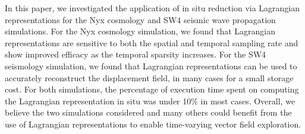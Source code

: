 In this paper, we investigated the application of in situ reduction via Lagrangian representations for the Nyx cosmology and SW4 seismic wave propagation simulations.
%
For the Nyx cosmology simulation, we found that Lagrangian representations are sensitive to both the spatial and temporal sampling rate and show improved efficacy as the temporal sparsity increases.
%
For the SW4 seismology simulation, we found that Lagrangian representations can be used to accurately reconstruct the displacement field, in many cases for a small storage cost.
%
For both simulations, the percentage of execution time spent on computing the Lagrangian representation in situ was under 10\% in most cases.
%
Overall, we believe the two simulations considered and many others could benefit from the use of Lagrangian representations to enable time-varying vector field exploration. 
